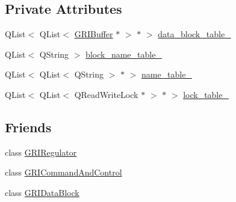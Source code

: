 \subsection*{\-Private \-Attributes}
\begin{DoxyCompactItemize}
\item 
\-Q\-List$<$ \-Q\-List$<$ \hyperlink{classGRIBuffer}{\-G\-R\-I\-Buffer} $\ast$ $>$ $\ast$ $>$ \hyperlink{classGRIMemoryManager_abd04ed6d04867c3852265a53322cff40}{data\-\_\-block\-\_\-table\-\_\-}
\item 
\-Q\-List$<$ \-Q\-String $>$ \hyperlink{classGRIMemoryManager_a0bdccd3ae8eb1e8958b767320d39be7f}{block\-\_\-name\-\_\-table\-\_\-}
\item 
\-Q\-List$<$ \-Q\-List$<$ \-Q\-String $>$ $\ast$ $>$ \hyperlink{classGRIMemoryManager_ab2b96c8f5f3c3d9f5216d871657b1d17}{name\-\_\-table\-\_\-}
\item 
\-Q\-List$<$ \-Q\-List$<$ \-Q\-Read\-Write\-Lock $\ast$ $>$ $\ast$ $>$ \hyperlink{classGRIMemoryManager_a30e6c169ecae9a513ecd4d4e07b38e71}{lock\-\_\-table\-\_\-}
\end{DoxyCompactItemize}
\subsection*{\-Friends}
\begin{DoxyCompactItemize}
\item 
class \hyperlink{classGRIMemoryManager_a87f833908baa28aac760656947c70c04}{\-G\-R\-I\-Regulator}
\item 
class \hyperlink{classGRIMemoryManager_ae5d9162c1cf3d4e10a949c025ad576d7}{\-G\-R\-I\-Command\-And\-Control}
\item 
class \hyperlink{classGRIMemoryManager_a02a3c0a1755a1c589621c9f0f0f871f1}{\-G\-R\-I\-Data\-Block}
\end{DoxyCompactItemize}


